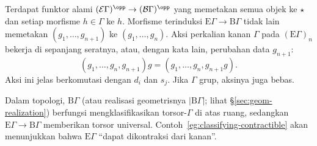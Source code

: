 \begin{example}
	Terdapat funktor alami
	$(\mathcal{E}\Gamma)^{\opp}\to(\mathcal{B}\Gamma)^{\opp}$ yang memetakan
	semua objek ke $\star$ dan setiap morfisme $h\in\Gamma$ ke $h$.
	Morfisme terinduksi $\mathrm{E}\Gamma\to\mathrm{B}\Gamma$ tidak lain
	memetakan $(g_1,\ldots,g_{n+1})$ ke $(g_1,\ldots,g_n)$. Aksi perkalian
	kanan $\Gamma$ pada $(\mathrm{E}\Gamma)_n$ bekerja di sepanjang seratnya, atau,
	dengan kata lain, perubahan data $g_{n+1}$:
	\[ (g_1, \ldots, g_n, g_{n+1})g = (g_1, \ldots, g_n, g_{n+1}g). \]
	Aksi ini jelas berkomutasi dengan $d_i$ dan $s_j$. Jika $\Gamma$ grup,
	aksinya juga bebas.

	Dalam topologi, $\mathrm{B}\Gamma$ (atau realisasi geometrisnya
	$|\mathrm{B}\Gamma|$; lihat \S\ref{sec:geom-realization}) berfungsi
	mengklasifikasikan torsor-$\Gamma$ di atas ruang, sedangkan
	$\mathrm{E}\Gamma\to\mathrm{B}\Gamma$ memberikan torsor universal.
	Contoh~\ref{eg:classifying-contractible} akan menunjukkan bahwa
	$\mathrm{E}\Gamma$ ``dapat dikontraksi dari kanan''.
\end{example}
